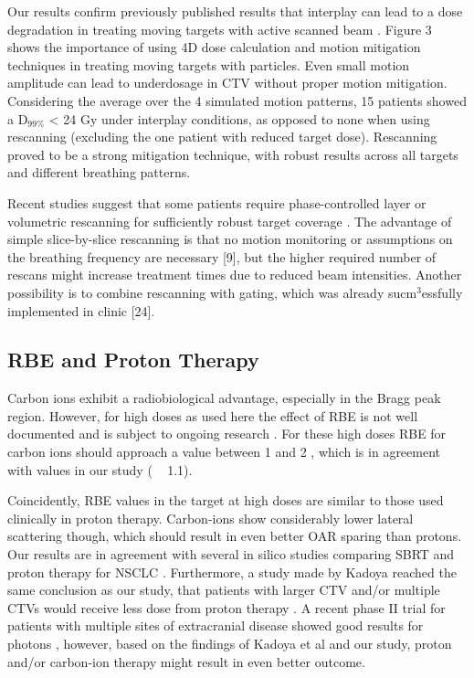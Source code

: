 \documentclass[type=dr, dr=rernat, acm$^3$entcolor=tud7b,colorbacktitle, bigchapter, openright, twoside, 12pt ]{tudthesis}
\begin{document}
Our results confirm previously published results that interplay can lead to a dose degradation in treating moving targets with active scanned beam \cite{Bert2008}. Figure 3 shows the importance of using 4D dose calculation and motion mitigation techniques in treating moving targets with particles. Even small motion amplitude can lead to underdosage in CTV without proper motion mitigation. Considering the average over the 4 simulated motion patterns, 15 patients showed a D$_{99\%}$ < 24 Gy under interplay conditions, as opposed to none when using rescanning (excluding the one patient with reduced target dose). Rescanning proved to be a strong mitigation technique, with robust results across all targets and different breathing patterns.

Recent studies suggest that some patients require phase-controlled layer or volumetric rescanning for sufficiently robust target coverage \cite{Mori2013,Takahashi2014}. The advantage of simple slice-by-slice rescanning is that no motion monitoring or assumptions on the breathing frequency are necessary [9], but the higher required number of rescans might increase treatment times due to reduced beam intensities. Another possibility is to combine rescanning with gating, which was already sucm$^{3}$essfully implemented in clinic [24].




\subsection{RBE and Proton Therapy}

Carbon ions exhibit a radiobiological advantage, especially in the Bragg peak region. However, for high doses as used here the effect of RBE is not well documented and is subject to ongoing research \cite{Friedrich2014}. For these high doses RBE for carbon ions should approach a value between 1 and 2 \cite{Carabe2007}, which is in agreement with values in our study ( ~ 1.1).

Coincidently, RBE values in the target at high doses are similar to those used clinically in proton therapy. Carbon-ions show considerably lower lateral scattering though, which should result in even better OAR sparing than protons. Our results are in agreement with several in silico studies comparing SBRT and proton therapy for NSCLC \cite{Roelofs2012, Kadoya2010, Register2010}. Furthermore, a study made by Kadoya reached the same conclusion as our study, that patients with larger CTV and/or multiple CTVs would  receive less dose from proton therapy \cite{Kadoya2010}. A recent phase II trial for patients with multiple sites of extracranial disease showed good results for photons \cite{Iyengar2014}, however, based on the findings of Kadoya et al and our study, proton and/or carbon-ion therapy might result in even better outcome. 
\end{document}
